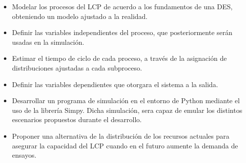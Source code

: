 \begin{itemize}
	\item Modelar los procesos del LCP
		de acuerdo a los fundamentos de una DES,
		obteniendo un modelo ajustado a la realidad.
	\item Definir las variables independientes del proceso,
		que posteriormente serán usadas en la simulación.
	\item Estimar el tiempo de ciclo de cada proceso,
		a través de la asignación de
		distribuciones ajustadas a cada subproceso.
	\item Definir las variables dependientes
		que otorgara el sistema a la salida.
	\item Desarrollar un programa de simulación en el entorno de Python
		mediante el uso de la librería Simpy.
		Dicha simulación, sera capaz de emular
		los distintos escenarios propuestos durante el desarrollo.
	\item Proponer una alternativa de la distribución de los recursos actuales
		para asegurar la capacidad del LCP cuando en el futuro aumente la
		demanda de ensayos.
\end{itemize}
